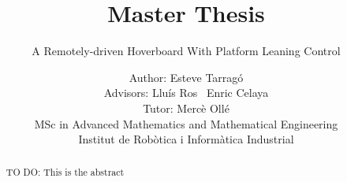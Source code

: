 \documentclass{scrartcl}
\title{Master Thesis}
\subtitle{A Remotely-driven Hoverboard With Platform Leaning Control}
\author{Author: Esteve Tarrag\'o \\
	Advisors: Llu\'is Ros \ Enric Celaya\\
	Tutor: Merc\`e Oll\'e\\
	MSc in Advanced Mathematics and Mathematical Engineering\\
	Institut de Robòtica i Informàtica Industrial
}
\begin{document}
\maketitle

\newpage
\begin{abstract}
	TO DO: This is the abstract
\end{abstract}

\newpage
\tableofcontents






\end{document}
